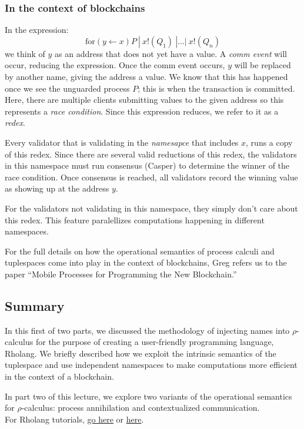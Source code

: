 \documentclass[12pt]{article}
\numberwithin{equation}{section}
\begin{document}
\subsubsection{In the context of blockchains}
In the expression:
\[ \text{for}( y \leftarrow x )P \ | \ x!(Q_1) \ | \dots | \ x!(Q_n) \]
we think of $y$ as an address that does not yet have a value. A \emph{comm event} will occur, reducing the expression. Once the comm event occurs, $y$ will be replaced by another name, giving the address a value.  We know that this has happened once we see the unguarded process $P$; this is when the transaction is committed. Here, there are multiple clients submitting values to the given address so this represents a \emph{race condition}. Since this expression reduces, we refer to it as a \emph{redex}.

Every validator that is validating in the \emph{namesapce} that includes $x$, runs a copy of this redex. Since there are several valid reductions of this redex, the validators in this namespace must run consensus (Casper) to determine the winner of the race condition. Once consensus is reached, all validators record the winning value as showing up at the address $y$.

For the validators not validating in this namespace, they simply don't care about this redex. This feature paralellizes computations happening in different namespaces.

For the full details on how the operational semantics of process calculi and tuplespaces come into play in the context of blockchains, Greg refers us to the paper ``Mobile Processes for Programming the New Blockchain.''


\subsection{Summary}
In this first of two parts, we discussed the methodology of injecting names into $\rho$-calculus for the purpose of creating a user-friendly programming language, Rholang. We briefly described how we exploit the intrinsic semantics of the tuplespace and use independent namespaces to make computations more efficient in the context of a blockchain.

In part two of this lecture, we explore two variants of the operational semantics for $\rho$-calculus: process annihilation and contextualized communication. \\

For Rholang tutorials, \href{https://github.com/JoshOrndorff/LearnRholangByExample}{go here} or \href{https://developer.rchain.coop/tutorial/}{here}.
\end{document}
